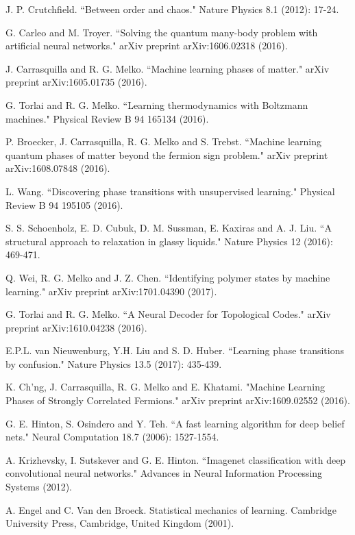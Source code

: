 \documentclass[pra,letterpaper,10pt,twocolumn]{revtex4}
\begin{document}
\begin{thebibliography}{100}
J. P. Crutchfield. ``Between order and chaos." Nature Physics 8.1 (2012): 17-24.

G. Carleo and M. Troyer. ``Solving the quantum many-body problem with artificial neural networks." arXiv preprint arXiv:1606.02318 (2016).

J. Carrasquilla and R. G. Melko. ``Machine learning phases of matter." arXiv preprint arXiv:1605.01735 (2016).

G. Torlai and R. G. Melko. ``Learning thermodynamics with Boltzmann machines." Physical Review B 94 165134 (2016).

P. Broecker, J. Carrasquilla, R. G. Melko and S. Trebst. ``Machine learning quantum phases of matter beyond the fermion sign problem." arXiv preprint arXiv:1608.07848 (2016).

L. Wang. ``Discovering phase transitions with unsupervised learning." Physical Review B 94 195105 (2016).

S. S. Schoenholz, E. D. Cubuk, D. M. Sussman, E. Kaxiras and A. J. Liu. ``A structural approach to relaxation in glassy liquids." Nature Physics 12 (2016): 469-471.

Q. Wei, R. G. Melko and J. Z. Chen. ``Identifying polymer states by machine learning." arXiv preprint arXiv:1701.04390 (2017).

G. Torlai and R. G. Melko. ``A Neural Decoder for Topological Codes." arXiv preprint arXiv:1610.04238 (2016).

E.P.L. van Nieuwenburg, Y.H. Liu and S. D. Huber. ``Learning phase transitions by confusion." Nature Physics 13.5 (2017): 435-439.

K. Ch'ng, J. Carrasquilla, R. G. Melko and E. Khatami. "Machine Learning Phases of Strongly Correlated Fermions." arXiv preprint arXiv:1609.02552 (2016).

G. E. Hinton, S. Osindero and Y. Teh. ``A fast learning algorithm for deep belief nets." Neural Computation 18.7 (2006): 1527-1554.

A. Krizhevsky, I. Sutskever and G. E. Hinton. ``Imagenet classification with deep convolutional neural networks." Advances in Neural Information Processing Systems (2012).

A. Engel and C. Van den Broeck. Statistical mechanics of learning. Cambridge University Press, Cambridge, United Kingdom (2001).


\end{thebibliography}
\end{document}
